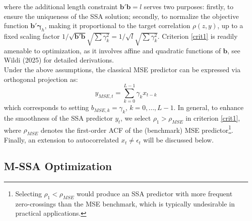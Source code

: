 \documentclass[11pt,a4paper]{article}
\begin{document}
where the additional length constraint $\mathbf{b}'\mathbf{b}=l$ serves two purposes: firstly, to ensure the uniqueness of the SSA solution; secondly, to normalize the objective function $\mathbf{b}'\boldsymbol{\gamma}_{h}$, making it proportional to the target correlation $\rho(z,y)$, up to a fixed scaling factor $1/\sqrt{\mathbf{b}'\mathbf{b}}\sqrt{\sum \gamma_k^2}=1/\sqrt{l}\sqrt{\sum \gamma_k^2}$. Criterion \ref{crit1} is readily amenable to optimization, as it involves affine and quadratic functions of $\mathbf{b}$, see Wildi (2025) for detailed derivations. \\
Under the above assumptions, the classical MSE predictor can be expressed via orthogonal projection as:
\[
y_{MSE,t}=\sum_{k=0}^{L-1}\gamma_kx_{t-k}
\]
which corresponds to setting $b_{MSE,k}=\gamma_k$, $k=0,...,L-1$. In general, to enhance the smoothness of the SSA predictor $y_t$, we select $\rho_1>\rho_{MSE}$ in criterion \ref{crit1},  where $\rho_{MSE}$ denotes the first-order ACF of the (benchmark) MSE predictor\footnote{Selecting $\rho_1<\rho_{MSE}$ would produce an SSA predictor with more frequent zero-crossings than the MSE benchmark, which is typically undesirable in practical applications.}. Finally,  an extension to autocorrelated $x_t\neq \epsilon_t$ will be discussed below.
 




\subsection{M-SSA Optimization}
\end{document}
